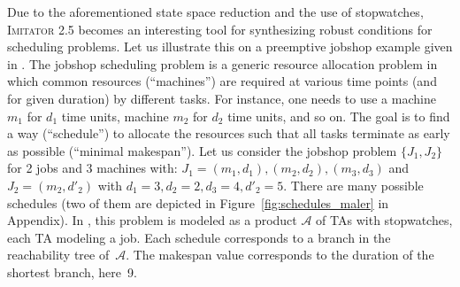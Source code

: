 \documentclass{llncs}
\newcommand{\A}{\mathcal{A}}
\newcommand{\imitator}{\textsc{Imitator}}
\begin{document}
Due to the aforementioned state space reduction and the use of stopwatches, \imitator{} 2.5 becomes an interesting tool for synthesizing robust conditions for scheduling problems.
Let us illustrate this on a preemptive jobshop example given in \cite{AM02}.
The jobshop scheduling problem is a generic resource allocation problem in which common resources (``machines'') are required at various time points (and for given duration) by different tasks.
For instance, one needs to use a machine $m_1$ for $d_1$ time units, machine $m_2$ for $d_2$ time units, and so on.
The goal is to find a way (``schedule'') to allocate the resources such that all tasks terminate as early as possible (``minimal makespan'').
%
Let us consider the jobshop problem $\{J_1, J_2\}$ for 2 jobs and 3 machines  with: $J_1 = (m_1,d_1), (m_2,d_2),(m_3,d_3)$ and $J_2 = (m_2,d'_2)$ with $d_1 = 3, d_2=2, d_3=4, d'_2 = 5$.
There are many possible schedules (two of them are depicted in Figure~\ref{fig:schedules_maler} in Appendix). 
%
In  \cite{AM02}, this problem is modeled as a product $\A$ of TAs with stopwatches, each TA modeling a job.
Each schedule corresponds to a branch in the reachability tree of~$\A$.
The makespan value corresponds to the
duration of the shortest branch, here~9.
% 
\end{document}
